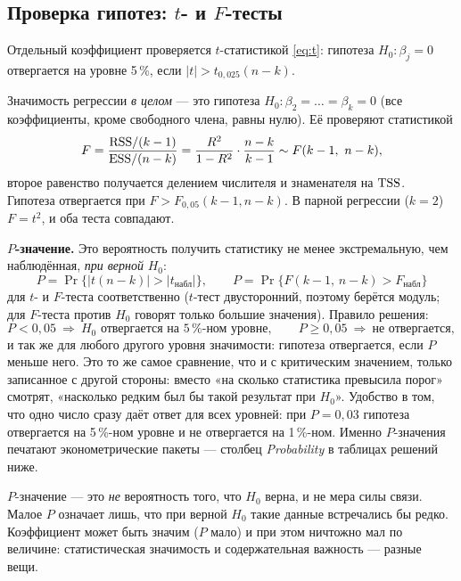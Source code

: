 \subsection{Проверка гипотез: $t$- и $F$-тесты}\label{sec:tests}

Отдельный коэффициент проверяется $t$-статистикой \eqref{eq:t}: гипотеза
$H_0\colon \beta_j = 0$ отвергается на уровне 5\,\%, если
$|t| > t_{0{,}025}(n-k)$.

Значимость регрессии \emph{в целом} — это гипотеза
$H_0\colon \beta_2 = \dots = \beta_k = 0$ (все коэффициенты, кроме свободного
члена, равны нулю). Её проверяют статистикой
\begin{equation}
  F = \frac{\mathrm{RSS}/(k-1)}{\mathrm{ESS}/(n-k)}
    = \frac{R^2}{1-R^2}\cdot\frac{n-k}{k-1} \sim F(k-1,\ n-k),
  \label{eq:f}
\end{equation}
второе равенство получается делением числителя и знаменателя на $\mathrm{TSS}$.
Гипотеза отвергается при $F > F_{0{,}05}(k-1, n-k)$. В парной регрессии
($k = 2$) $F = t^2$, и оба теста совпадают.

\textbf{$P$-значение.} Это вероятность получить статистику не менее
экстремальную, чем наблюдённая, \emph{при верной} $H_0$:
\[
  P = \Pr\bigl\{|t(n-k)| > |t_{\text{набл}}|\bigr\},
  \qquad
  P = \Pr\bigl\{F(k-1,\, n-k) > F_{\text{набл}}\bigr\}
\]
для $t$- и $F$-теста соответственно ($t$-тест двусторонний, поэтому берётся
модуль; для $F$-теста против $H_0$ говорят только большие значения). Правило
решения:
\[
  P < 0{,}05 \ \Longrightarrow\ H_0 \text{ отвергается на } 5\,\%\text{-ном уровне},
  \qquad
  P \geqslant 0{,}05 \ \Longrightarrow\ \text{не отвергается},
\]
и так же для любого другого уровня значимости: гипотеза отвергается, если
$P$ меньше него. Это то же самое сравнение, что и с критическим значением,
только записанное с другой стороны: вместо «на сколько статистика превысила
порог» смотрят, «насколько редким был бы такой результат при $H_0$». Удобство в
том, что одно число сразу даёт ответ для всех уровней: при $P = 0{,}03$ гипотеза
отвергается на 5\,\%-ном уровне и не отвергается на 1\,\%-ном. Именно
$P$-значения печатают эконометрические пакеты — столбец \emph{Probability} в
таблицах решений ниже.

\begin{remark}
$P$-значение — это \emph{не} вероятность того, что $H_0$ верна, и не мера силы
связи. Малое $P$ означает лишь, что при верной $H_0$ такие данные встречались бы
редко. Коэффициент может быть значим ($P$ мало) и при этом ничтожно мал по
величине: статистическая значимость и содержательная важность — разные вещи.
\end{remark}

